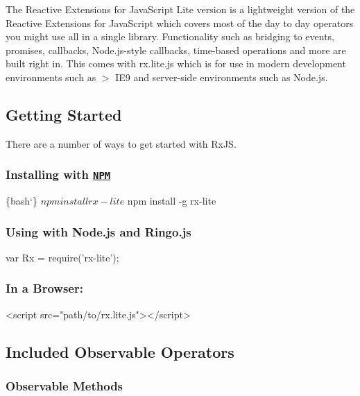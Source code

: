 The Reactive Extensions for Java\+Script Lite version is a lightweight version of the Reactive Extensions for Java\+Script which covers most of the day to day operators you might use all in a single library. Functionality such as bridging to events, promises, callbacks, Node.\+js-\/style callbacks, time-\/based operations and more are built right in. This comes with {\ttfamily rx.\+lite.\+js} which is for use in modern development environments such as $>$ I\+E9 and server-\/side environments such as Node.\+js.

\subsection*{Getting Started}

There are a number of ways to get started with Rx\+JS.

\subsubsection*{Installing with \href{https://npmjs.org/}{\tt N\+PM}}


\begin{DoxyCode}
\{bash`\}
$ npm install rx-lite
$ npm install -g rx-lite
\end{DoxyCode}


\subsubsection*{Using with Node.\+js and Ringo.\+js}


\begin{DoxyCode}
var Rx = require('rx-lite');
\end{DoxyCode}


\subsubsection*{In a Browser\+:}


\begin{DoxyCode}
<script src="path/to/rx.lite.js"></script>
\end{DoxyCode}


\subsection*{Included Observable Operators}

\subsubsection*{{\ttfamily Observable Methods}}



